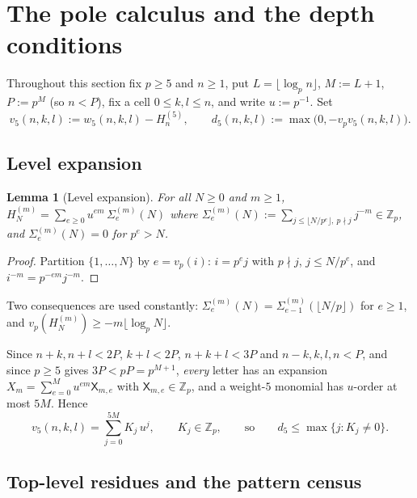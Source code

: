 \documentclass[11pt,reqno]{amsart}
\theoremstyle{plain}
\newtheorem{lemma}[theorem]{Lemma}
\theoremstyle{definition}
\theoremstyle{remark}
\numberwithin{equation}{section}
\newcommand{\ZZ}{\mathbb{Z}}
\newcommand{\Zp}{\ZZ_p}
\newcommand{\wfive}{w_5}
\newcommand{\vfive}{v_5}
\begin{document}
\section{The pole calculus and the depth conditions}\label{sec:depth}

Throughout this section fix $p\ge5$ and $n\ge1$, put $L=\lfloor\log_p n\rfloor$, $M:=L+1$,
$P:=p^{M}$ (so $n<P$), fix a cell $0\le k,l\le n$, and write $u:=p^{-1}$. Set
\[
\vfive(n,k,l):=\wfive(n,k,l)-H^{(5)}_n,\qquad
d_5(n,k,l):=\max\bigl(0,-v_p\vfive(n,k,l)\bigr).
\]

\subsection{Level expansion}

\begin{lemma}[Level expansion]\label{lem:U}
For all $N\ge0$ and $m\ge1$,
$H^{(m)}_N=\sum_{e\ge0}u^{em}\,\Sigma^{(m)}_e(N)$ where
$\Sigma^{(m)}_e(N):=\sum_{j\le\lfloor N/p^e\rfloor,\ p\nmid j}j^{-m}\in\Zp$, and
$\Sigma^{(m)}_e(N)=0$ for $p^e>N$.
\end{lemma}

\begin{proof}
Partition $\{1,\dots,N\}$ by $e=v_p(i)$: $i=p^ej$ with $p\nmid j$, $j\le N/p^e$, and
$i^{-m}=p^{-em}j^{-m}$.
\end{proof}

Two consequences are used constantly: $\Sigma^{(m)}_e(N)=\Sigma^{(m)}_{e-1}(\lfloor N/p\rfloor)$
for $e\ge1$, and $v_p(H^{(m)}_N)\ge-m\lfloor\log_pN\rfloor$.

Since $n+k,n+l<2P$, $k+l<2P$, $n+k+l<3P$ and $n-k,k,l,n<P$, and since $p\ge5$ gives
$3P<pP=p^{M+1}$, \emph{every} letter has an expansion $X_m=\sum_{e=0}^{M}u^{em}\mathsf X_{m,e}$
with $\mathsf X_{m,e}\in\Zp$, and a weight-$5$ monomial has $u$-order at most $5M$. Hence
\begin{equation}\label{eq:Kexp}
\vfive(n,k,l)=\sum_{j=0}^{5M}K_j\,u^{j},\qquad K_j\in\Zp,
\qquad\text{so}\qquad d_5\le\max\{j:K_j\ne0\}.
\end{equation}

\subsection{Top-level residues and the pattern census}
\end{document}
